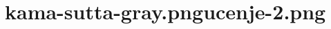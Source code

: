 

\cleartoverso

\vspace*{30mm}

\begin{verse}


\end{verse}


\chapter[D Sutta]{{kama-sutta-gray.png}{ucenje-2.png}}


\begin{verse}



\end{verse}


\clearpage
\begin{verse}


\end{verse}


\clearpage
\begin{verse}


\end{verse}

